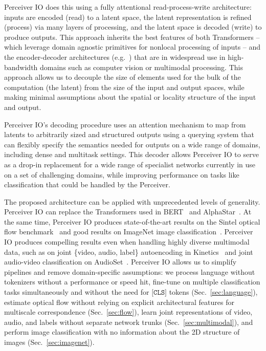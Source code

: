 \documentclass{article} %
\newcommand{\ourmodel}{Perceiver IO\xspace}
\begin{document}
\ourmodel{} does this using a fully attentional read-process-write architecture: inputs are encoded (read) to a latent space, the latent representation is refined (process) via many layers of processing, and the latent space is decoded (write) to produce outputs. This approach inherits the best features of both Transformers -- which leverage domain agnostic primitives for nonlocal processing of inputs -- and the encoder-decoder architectures (e.g.~\citealt{ronnenberger2015convolutional, newell2016stacked}) that are in widespread use in high-bandwidth domains such as computer vision or multimodal processing. This approach allows us to decouple the size of elements used for the bulk of the computation (the latent) from the size of the input and output spaces, while making minimal assumptions about the spatial or locality structure of the input and output. 

\ourmodel{}'s decoding procedure uses an attention mechanism to map from latents to arbitrarily sized and structured outputs using a querying system that can flexibly specify the semantics needed for outputs on a wide range of domains, including dense and multitask settings. This decoder allows \ourmodel{} to serve as a drop-in replacement for a wide range of specialist networks currently in use on a set of challenging domains, while improving performance on tasks like classification that could be handled by the Perceiver.

The proposed architecture can be applied with unprecedented levels of generality. \ourmodel{} can replace the Transformers used in BERT~\citep{devlin2019bert} and AlphaStar~\citep{vinyals2019grandmaster}. At the same time, \ourmodel{} produces state-of-the-art results on the Sintel optical flow benchmark~\citep{butler2012naturalistic} and good results on ImageNet image classification~\citep{deng2009imagenet}. \ourmodel{} produces compelling results even when handling highly diverse multimodal data, such as on joint \{video, audio, label\} autoencoding in Kinetics~\citep{smaira2020short} and joint audio-video classification on AudioSet~\citep{gemmeke2017audio}. \ourmodel{} allows us to simplify pipelines and remove domain-specific assumptions: we process language without tokenizers without a performance or speed hit, fine-tune on multiple classification tasks simultaneously and without the need for $\texttt{[CLS]}$ tokens (Sec.~\ref{sec:language}), estimate optical flow without relying on explicit architectural features for multiscale correspondence (Sec.~\ref{sec:flow}), learn joint representations of video, audio, and labels without separate network trunks (Sec.~\ref{sec:multimodal}), and perform image classification with no information about the 2D structure of images (Sec.~\ref{sec:imagenet}).
\end{document}
